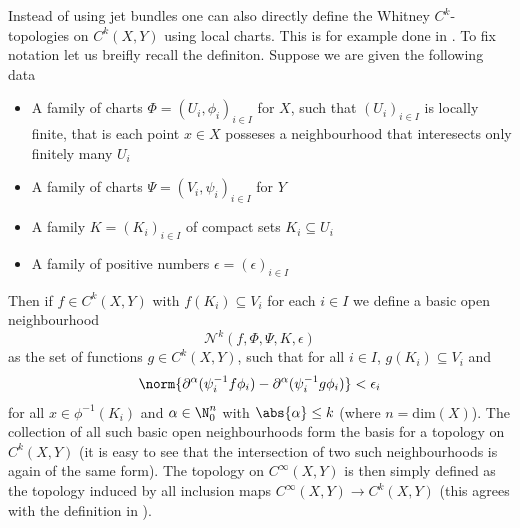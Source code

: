 Instead of using jet bundles one can also directly define the Whitney $C^k$-topologies on $C^k(X,Y)$ using local charts. This is for example done in \cite{hirsch2012differential}. To fix notation let us breifly recall the definiton. Suppose we are given the following data 
\begin{itemize}
    \item A family of charts $\Phi = (U_i,\phi_i)_{i\in I}$ for $X$, such that $(U_i)_{i\in I}$ is locally finite, that is each point $x \in X$ posseses a neighbourhood that interesects only finitely many $U_i$
    \item A family of charts $\Psi = (V_i,\psi_i)_{i \in I}$ for $Y$
    \item A family $K= (K_i)_{i \in I}$ of compact sets $K_i \subseteq U_i$
    \item A family of positive numbers $\epsilon = (\epsilon)_{i \in I}$
\end{itemize} 
Then if $f \in C^k(X,Y)$ with $f(K_i) \subseteq V_i$ for each $i \in I$ we define a basic open neighbourhood
\[
\mathcal{N}^k(f,\Phi,\Psi,K,\epsilon)
\]
as the set of functions $g \in C^k(X,Y)$, such that for all $i \in I$, $g(K_i) \subseteq V_i$ and 
\[
\norm{\partial^\alpha(\psi_i^{-1}f\phi_i) - \partial^\alpha(\psi_i^{-1}g\phi_i)} < \epsilon_i
\]
for all $x \in \phi^{-1}(K_i)$ and $\alpha \in \N_0^n$ with $\abs{\alpha} \leq k$ (where $n = \mathrm{dim}(X)$). The collection of all such basic open neighbourhoods form the basis for a topology on $C^k(X,Y)$ (it is easy to see that the intersection of two such neighbourhoods is again of the same form). The topology on $C^\infty(X,Y)$ is then simply defined as the topology induced by all inclusion maps $C^\infty(X,Y) \to C^k(X,Y)$ (this agrees with the definition in \cite{golubitsky2012stable}).

